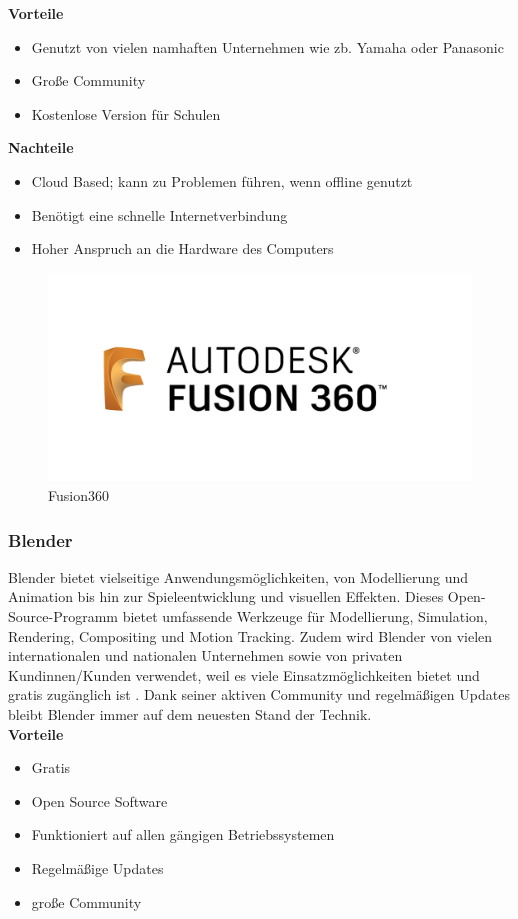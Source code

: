 \textbf{Vorteile}
\begin{itemize}
	\item Genutzt von vielen namhaften Unternehmen wie zb. Yamaha oder Panasonic
	\item Große Community
	\item Kostenlose Version für Schulen \parencite{AutodeskFusionReviews}
\end{itemize} 

\textbf{Nachteile}
\begin{itemize}
	\item Cloud Based; kann zu Problemen führen, wenn offline genutzt 
	\item Benötigt eine schnelle Internetverbindung
	\item Hoher Anspruch an die Hardware des Computers \parencite{AutodeskFusionReviews}
\end{itemize}

\begin{figure}[H]
	\centering
	\includegraphics[width=0.3\linewidth]{images/Fusion360.png}
	\caption[Fusion360]{Fusion360}
	\label{fig:Autodesk Fusion}
\end{figure}



\subsubsection{Blender} 
Blender bietet vielseitige Anwendungsmöglichkeiten, von Modellierung und Animation bis hin zur Spieleentwicklung und visuellen Effekten. Dieses Open-Source-Programm bietet umfassende Werkzeuge für Modellierung, Simulation, Rendering, Compositing und Motion Tracking. Zudem wird Blender von vielen internationalen und nationalen Unternehmen sowie von privaten Kundinnen/Kunden verwendet, weil es viele Einsatzmöglichkeiten bietet und gratis zugänglich ist \parencite{Blender}. Dank seiner aktiven Community und regelmäßigen Updates bleibt Blender immer auf dem neuesten Stand der Technik. \\


\textbf{Vorteile}
\begin{itemize}
	\item Gratis 
	\item Open Source Software
	\item Funktioniert auf allen gängigen Betriebssystemen
	\item Regelmäßige Updates
	\item große Community \parencite{BlenderProsUndCons}
\end{itemize}

